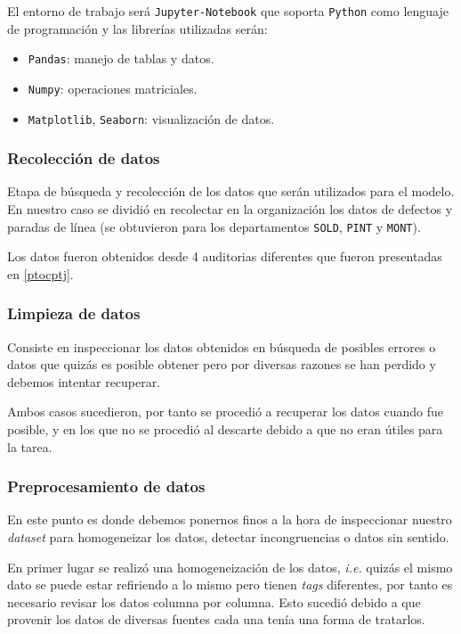 \documentclass[a4paper,12pt]{article}
\begin{document}
El entorno de trabajo será \texttt{Jupyter-Notebook} que soporta \texttt{Python} como lenguaje de programación y las librerías utilizadas serán: 
\begin{itemize}
	\item \texttt{Pandas}: manejo de tablas y datos.
	\item \texttt{Numpy}: operaciones matriciales.
	\item \texttt{Matplotlib}, \texttt{Seaborn}: visualización de datos.
\end{itemize}

\subsubsection{Recolección de datos}
Etapa de búsqueda y recolección de los datos que serán utilizados para el modelo. En nuestro caso se dividió en recolectar en la organización los datos de defectos y paradas de línea (se obtuvieron para los departamentos \texttt{SOLD}, \texttt{PINT} y \texttt{MONT}).

Los datos fueron obtenidos desde 4 auditorias diferentes que fueron presentadas en \ref{ptocptj}.

\subsubsection{Limpieza de datos}
Consiste en inspeccionar los datos obtenidos en búsqueda de posibles errores o datos que quizás es posible obtener pero por diversas razones se han perdido y debemos intentar recuperar.

Ambos casos sucedieron, por tanto se procedió a recuperar los datos cuando fue posible, y en los que no se procedió al descarte debido a que no eran útiles para la tarea.

\subsubsection{Preprocesamiento de datos}

En este punto es donde debemos ponernos finos a la hora de inspeccionar nuestro \textit{dataset} para homogeneizar los datos, detectar incongruencias o datos sin sentido.

En primer lugar se realizó una homogeneización de los datos, \textit{i.e.} quizás el mismo dato se puede estar refiriendo a lo mismo pero tienen \textit{tags} diferentes, por tanto es necesario revisar los datos columna por columna. Esto sucedió debido a que provenir los datos de diversas fuentes cada una tenía una forma de tratarlos. 
\end{document}
